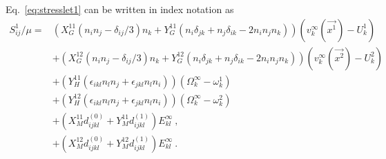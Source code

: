 \documentclass[reprint, amsmath,amssymb,aps,pre,onecolumn,notitlepage%
]{revtex4-1}
\begin{document}
Eq.~\eqref{eq:stresslet1} can be written in index notation as
\begin{equation}
	\begin{split}
		S^1_{ij}/\mu=& \left(X_G^{11}(n_in_j-\delta_{ij}/3)n_k+Y_G^{11}(n_i\delta_{jk}+n_j\delta_{ik}-2n_in_jn_k) \right)(v_k^\infty(\vec{x^1})-U_k^1)\\
		&+\left(X_G^{12}(n_in_j-\delta_{ij}/3)n_k+Y_G^{12}(n_i\delta_{jk}+n_j\delta_{ik}-2n_in_jn_k) \right)(v_k^\infty(\vec{x^2})-U_k^2)\\
		&+ \left(Y_H^{11}(\epsilon_{ikl} n_l n_j+\epsilon_{jkl} n_l n_i) \right)(\Omega_k^\infty-\omega_k^1)\\
		&+ \left(Y_H^{12}(\epsilon_{ikl} n_l n_j+\epsilon_{jkl} n_l n_i) \right)(\Omega_k^\infty-\omega_k^2)\\
		&+\left( X_M^{11}d^{(0)}_{ijkl}+Y_M^{11}d^{(1)}_{ijkl}\right) E^\infty_{kl}\ ,\\
		&+\left( X_M^{12}d^{(0)}_{ijkl}+Y_M^{12}d^{(1)}_{ijkl}\right) E^\infty_{kl}\ .
	\end{split}
\end{equation}
\end{document}
